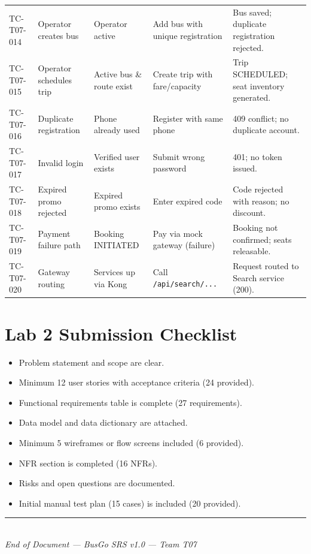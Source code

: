 \documentclass[11pt,a4paper]{article}
\begin{document}
\begin{longtable}{p{1.9cm} p{2.4cm} p{2.4cm} Y Y}
TC-T07-014 & Operator creates bus & Operator active & Add bus with unique registration & Bus saved; duplicate registration rejected. \\
TC-T07-015 & Operator schedules trip & Active bus \& route exist & Create trip with fare/capacity & Trip SCHEDULED; seat inventory generated. \\
TC-T07-016 & Duplicate registration & Phone already used & Register with same phone & 409 conflict; no duplicate account. \\
TC-T07-017 & Invalid login & Verified user exists & Submit wrong password & 401; no token issued. \\
TC-T07-018 & Expired promo rejected & Expired promo exists & Enter expired code & Code rejected with reason; no discount. \\
TC-T07-019 & Payment failure path & Booking INITIATED & Pay via mock gateway (failure) & Booking not confirmed; seats releasable. \\
TC-T07-020 & Gateway routing & Services up via Kong & Call \texttt{/api/search/...} & Request routed to Search service (200). \\
\bottomrule
\end{longtable}

\section{Lab 2 Submission Checklist}
\begin{itemize}[leftmargin=2em, label=$\boxtimes$]
  \item Problem statement and scope are clear.
  \item Minimum 12 user stories with acceptance criteria (24 provided).
  \item Functional requirements table is complete (27 requirements).
  \item Data model and data dictionary are attached.
  \item Minimum 5 wireframes or flow screens included (6 provided).
  \item NFR section is completed (16 NFRs).
  \item Risks and open questions are documented.
  \item Initial manual test plan (15 cases) is included (20 provided).
\end{itemize}

\vfill
\begin{center}
\rule{0.5\textwidth}{0.4pt}\\[4pt]
{\small \textit{End of Document — BusGo SRS v1.0 — Team T07}}
\end{center}
\end{document}
